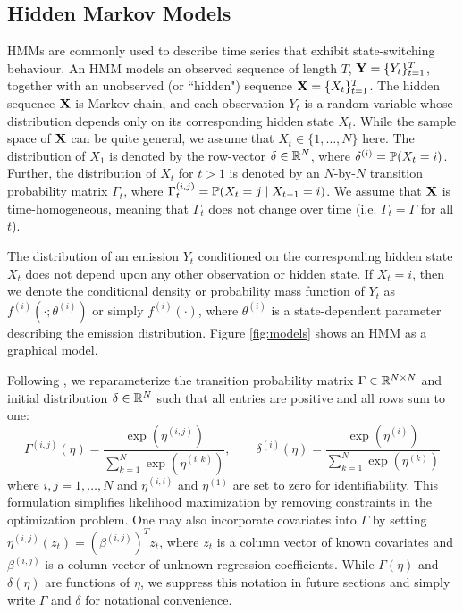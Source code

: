 \subsection{Hidden Markov Models}

HMMs are commonly used to describe time series that exhibit state-switching behaviour. An HMM models an observed sequence of length $T$, $\mathbf{Y} = \{Y_t\}_{t=1}^T$, together with an unobserved (or  ``hidden") sequence $\mathbf{X} = \{X_t\}_{t=1}^T$. The hidden sequence $\mathbf{X}$ is Markov chain, and each observation $Y_t$ is a random variable whose distribution depends only on its corresponding hidden state $X_t$. While the sample space of $\mathbf{X}$ can be quite general, we assume that $X_t \in \{1,\ldots,N\}$ here. The distribution of $X_1$ is denoted by the row-vector $\delta \in \mathbb{R}^N$, where $\delta^{(i)} = \mathbb{P}(X_t = i)$. Further, the distribution of $X_t$ for $t > 1$ is denoted by an $N$-by-$N$ transition probability matrix $\Gamma_t$, where $\Gamma_t^{(i,j)} = \mathbb{P}(X_t = j \mid X_{t-1} = i)$. We assume that $\mathbf{X}$ is time-homogeneous, meaning that $\Gamma_t$ does not change over time (i.e. $\Gamma_t = \Gamma$ for all $t$). 

The distribution of an emission $Y_t$ conditioned on the corresponding hidden state $X_t$ does not depend upon any other observation or hidden state. If $X_t=i$, then we denote the conditional density or probability mass function of $Y_t$ as $f^{(i)}(\cdot ; \theta^{(i)})$ or simply $f^{(i)}(\cdot)$, where $\theta^{(i)}$ is a state-dependent parameter describing the emission distribution. Figure \ref{fig:models} shows an HMM as a graphical model.

Following \citet{Barajas:2017}, we reparameterize the transition probability matrix $\Gamma \in \mathbb{R}^{N \times N}$ and initial distribution $\delta \in \mathbb{R}^N$ such that all entries are positive and all rows sum to one:
%
\begin{equation}
    \Gamma^{(i,j)}(\eta) = \frac{\exp(\eta^{(i,j)})}{\sum_{k=1}^N \exp(\eta^{(i,k)})}, \qquad \delta^{(i)}(\eta) = \frac{\exp(\eta^{(i)})}{\sum_{k=1}^N \exp(\eta^{(k)})}
    \label{eqn:reparam}
\end{equation}
%
where $i,j = 1,\ldots,N$ and $\eta^{(i,i)}$ and $\eta^{(1)}$ are set to zero for identifiability. This formulation simplifies likelihood maximization by removing constraints in the optimization problem. One may also incorporate covariates into $\Gamma$ by setting $\eta^{(i,j)}(z_t) = \left(\beta^{(i,j)}\right)^T z_t$, where $z_t$ is a column vector of known covariates and $\beta^{(i,j)}$ is a column vector of unknown regression coefficients. While $\Gamma(\eta)$ and $\delta(\eta)$ are functions of $\eta$, we suppress this notation in future sections and simply write $\Gamma$ and $\delta$ for notational convenience. 

